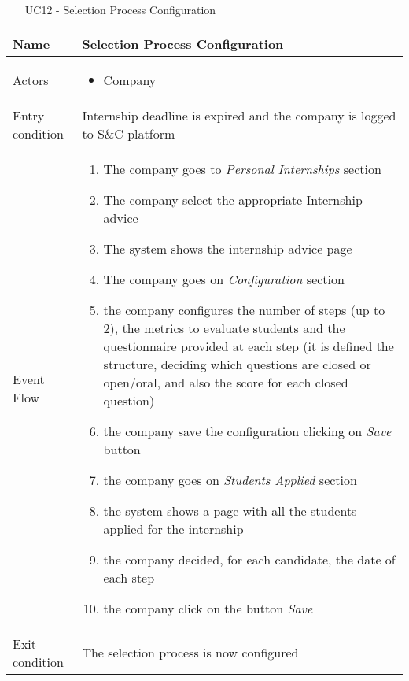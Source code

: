 				
				\begin{table} [H]
					\centering
					\begin{itemize}
						\item [UC12] - Selection Process Configuration
					\end{itemize}
					\begin{tabular}{|| P{7.5cm} | P{7.5cm} ||}
						\hline
						Name & Selection Process Configuration \\
						\hline
						Actors & \parbox{5cm}{\begin{itemize}
								\item Company
							\end{itemize}
						} \\
						\hline
						Entry condition & Internship deadline is expired and the 
						company is logged to S\&C platform  \\
						\hline
						Event Flow & \parbox{5cm}{\begin{enumerate}
								\item The company goes to \textit{Personal 
								Internships} section
								\item The company select the 
								appropriate Internship advice  
								\item The system shows the internship 
								advice page
								\item  The company goes on 
								\textit{Configuration} section
								\item  the company configures the 
								number of steps (up to 2), the 
								metrics to evaluate students and 
								the questionnaire provided at 
								each step (it is defined the structure, deciding which questions are closed or open/oral, and also the score for each closed question)
								\item the company save the 
								configuration clicking on \textit{Save}
								button 
								\item the company goes on \textit{Students 
								Applied} section
								\item the system shows a page with all 
								the students applied for the 
								internship 
								\item the company decided, for each 
								candidate, the date of each step
								\item the company click on the button 
								\textit{Save}
						\end{enumerate}} \\
						\hline 
						Exit condition & The selection process is now configured 

\end{tabular}
\end{table}

